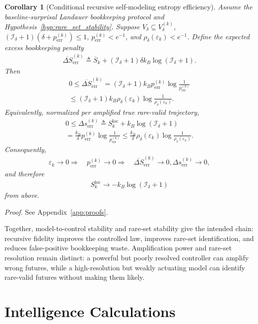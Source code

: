 \documentclass[
  aps,
  prresearch,
  reprint,
  amsmath,
  amssymb,
  superscriptaddress,
  nofootinbib,
  longbibliography
]{revtex4-2}
\def\EQSP{3pt}
\newcommand{\mltlne}[2][\EQSP]{\begingroup\setlength\abovedisplayskip{#1}\setlength\belowdisplayskip{#1}\begin{equation}\begin{multlined} #2 \end{multlined}\end{equation}\endgroup\noindent}
\newcommand{\cgather}[2][\EQSP]{\begingroup\setlength\abovedisplayskip{#1}\setlength\belowdisplayskip{#1}\begin{gather} #2 \end{gather}\endgroup\noindent}
\newcommand{\cgathers}[2][\EQSP]{\begingroup\setlength\abovedisplayskip{#1}\setlength\belowdisplayskip{#1}\begin{gather*} #2 \end{gather*}\endgroup\noindent}
\newtheorem{corollary}{Corollary}
\newcommand{\calI}{\mathcal{I}}
\begin{document}
\begin{corollary}[Conditional recursive self-modeling entropy efficiency]
\label{cor:conditional_entropy_efficiency}
Assume the baseline-surprisal Landauer bookkeeping protocol and
Hypothesis~\ref{hyp:rare_set_stability}. Suppose
\(V_\delta\subseteq V_\delta^{(k)}\),
\((\calI_\delta+1)(\delta+p_{\mathrm{err}}^{(k)})\leq1\),
\(p_{\mathrm{err}}^{(k)}<e^{-1}\), and
\(\rho_\delta(\varepsilon_k)<e^{-1}\). Define the expected excess bookkeeping penalty
\cgather{
    \overline{\Delta S}_{\mathrm{err}}^{(k)}
    \triangleq 
    \overline S_k
    +
    (\calI_\delta+1)\delta k_B\log(\calI_\delta+1).
    \label{eq:DeltaSerr_k_def}
}
Then
\mltlne{
    0
    \leq
    \overline{\Delta S}_{\mathrm{err}}^{(k)}
    =
    (\calI_\delta+1)k_B
    p_{\mathrm{err}}^{(k)}
    \log\frac{1}{p_{\mathrm{err}}^{(k)}}
    \\\leq
    (\calI_\delta+1)k_B
    \rho_\delta(\varepsilon_k)
    \log\frac{1}{\rho_\delta(\varepsilon_k)}.
    \label{eq:DeltaSerr_k_bound}}
Equivalently, normalized per amplified true rare-valid trajectory,
\mltlne{
    0
    \leq
    \Delta s_{\mathrm{err}}^{(k)}
    \triangleq 
    S_k^{\mathrm{loc}}
    +
    k_B\log(\calI_\delta+1)
    \\
    =
    \frac{k_B}{\delta}
    p_{\mathrm{err}}^{(k)}
    \log\frac{1}{p_{\mathrm{err}}^{(k)}}
    \leq
    \frac{k_B}{\delta}
    \rho_\delta(\varepsilon_k)
    \log\frac{1}{\rho_\delta(\varepsilon_k)}.
    \label{eq:Delta_s_err_k_bound}
}
Consequently,
\cgathers{
    \varepsilon_k\to 0
    \Longrightarrow\quad
    p_{\mathrm{err}}^{(k)}\to 0
    \Longrightarrow\quad
    \overline{\Delta S}_{\mathrm{err}}^{(k)}\to 0,
    \Delta s_{\mathrm{err}}^{(k)}\to 0,
}
and therefore
\cgather{
    S_k^{\mathrm{loc}}
    \to
    -k_B\log(\calI_\delta+1)
}
from above.
\end{corollary}
\noindent\emph{Proof.} See Appendix~\ref{app:proofs}.


Together, model-to-control stability and rare-set stability give the intended chain: recursive fidelity improves the controlled law, improves rare-set identification, and reduces false-positive bookkeeping waste. Amplification power and rare-set resolution remain distinct: a powerful but poorly resolved controller can amplify wrong futures, while a high-resolution but weakly actuating model can identify rare-valid futures without making them likely.


\section{Intelligence Calculations}
\end{document}
